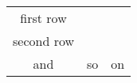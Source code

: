 
\begin{acronyms}
	\begin{tabular}{ccc}
		first row & & \\
		second row & & \\
		and & so & on \\
	\end{tabular}		
\end{acronyms}    
